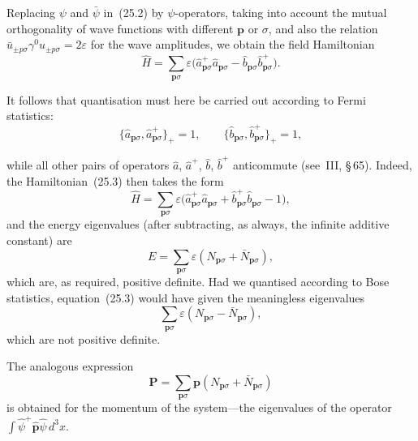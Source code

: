Replacing $\psi$ and $\bar\psi$ in~(25.2) by $\psi$-operators, taking into account the mutual orthogonality of wave functions with different $\mathbf{p}$ or $\sigma$, and also the relation $\bar u_{\pm p\sigma}\gamma^0 u_{\pm p\sigma} = 2\varepsilon$ for the wave amplitudes, we obtain the field Hamiltonian
\begin{equation}
\widehat H = \sum_{\mathbf{p}\sigma}\varepsilon\bigl(\widehat a^+_{\mathbf{p}\sigma}\widehat a_{\mathbf{p}\sigma} - \widehat b_{\mathbf{p}\sigma}\widehat b^+_{\mathbf{p}\sigma}\bigr).
\tag{25.3}
\end{equation}

It follows that quantisation must here be carried out according to Fermi statistics:
\begin{equation}
\{\widehat a_{\mathbf{p}\sigma}, \widehat a^+_{\mathbf{p}\sigma}\}_+ = 1,\qquad \{\widehat b_{\mathbf{p}\sigma}, \widehat b^+_{\mathbf{p}\sigma}\}_+ = 1,
\tag{25.4}
\end{equation}

while all other pairs of operators $\widehat a$, $\widehat a^+$, $\widehat b$, $\widehat b^+$ anticommute (see~III, \S\,65). Indeed, the Hamiltonian~(25.3) then takes the form
\[
\widehat H = \sum_{\mathbf{p}\sigma}\varepsilon\bigl(\widehat a^+_{\mathbf{p}\sigma}\widehat a_{\mathbf{p}\sigma} + \widehat b^+_{\mathbf{p}\sigma}\widehat b_{\mathbf{p}\sigma} - 1\bigr),
\]
and the energy eigenvalues (after subtracting, as always, the infinite additive constant) are
\begin{equation}
E = \sum_{\mathbf{p}\sigma}\varepsilon(N_{\mathbf{p}\sigma} + \bar N_{\mathbf{p}\sigma}),
\tag{25.5}
\end{equation}
which are, as required, positive definite. Had we quantised according to Bose statistics, equation~(25.3) would have given the meaningless eigenvalues
\[
\sum_{\mathbf{p}\sigma}\varepsilon(N_{\mathbf{p}\sigma} - \bar N_{\mathbf{p}\sigma}),
\]
which are not positive definite.

The analogous expression
\begin{equation}
\mathbf{P} = \sum_{\mathbf{p}\sigma}\mathbf{p}(N_{\mathbf{p}\sigma} + \bar N_{\mathbf{p}\sigma})
\tag{25.6}
\end{equation}
is obtained for the momentum of the system---the eigenvalues of the operator $\int \widehat\psi^+\widehat{\mathbf{p}}\widehat\psi\,d^3x$.


